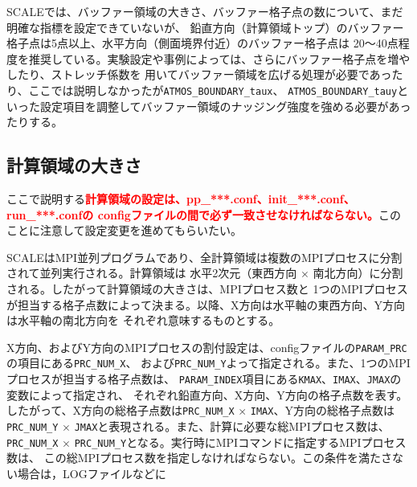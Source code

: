 SCALEでは、バッファー領域の大きさ、バッファー格子点の数について、まだ明確な指標を設定できていないが、
鉛直方向（計算領域トップ）のバッファー格子点は5点以上、水平方向（側面境界付近）のバッファー格子点は
20〜40点程度を推奨している。実験設定や事例によっては、さらにバッファー格子点を増やしたり、ストレッチ係数を
用いてバッファー領域を広げる処理が必要であったり、ここでは説明しなかったが\verb|ATMOS_BOUNDARY_taux|、
\verb|ATMOS_BOUNDARY_tauy|といった設定項目を調整してバッファー領域のナッジング強度を強める必要があったりする。



\subsection{計算領域の大きさ} \label{sec:adv_domainsize}
ここで説明する\textcolor{red}{\bf 計算領域の設定は、pp\_***.conf、init\_***.conf、run\_***.confの
configファイルの間で必ず一致させなければならない。}このことに注意して設定変更を進めてもらいたい。

SCALEはMPI並列プログラムであり、全計算領域は複数のMPIプロセスに分割されて並列実行される。計算領域は
水平2次元（東西方向 $\times$ 南北方向）に分割される。したがって計算領域の大きさは、MPIプロセス数と
1つのMPIプロセスが担当する格子点数によって決まる。以降、X方向は水平軸の東西方向、Y方向は水平軸の南北方向を
それぞれ意味するものとする。

X方向、およびY方向のMPIプロセスの割付設定は、configファイルの\verb|PARAM_PRC|の項目にある\verb|PRC_NUM_X|、
および\verb|PRC_NUM_Y|よって指定される。また、1つのMPIプロセスが担当する格子点数は、
\verb|PARAM_INDEX|項目にある\verb|KMAX|、\verb|IMAX|、\verb|JMAX|の変数によって指定され、
それぞれ鉛直方向、X方向、Y方向の格子点数を表す。
したがって、X方向の総格子点数は\verb|PRC_NUM_X| $\times$ \verb|IMAX|、Y方向の総格子点数は
\verb|PRC_NUM_Y| $\times$ \verb|JMAX|と表現される。また、計算に必要な総MPIプロセス数は、
\verb|PRC_NUM_X| $\times$ \verb|PRC_NUM_Y|となる。実行時にMPIコマンドに指定するMPIプロセス数は、
この総MPIプロセス数を指定しなければならない。この条件を満たさない場合は，LOGファイルなどに\\

{\small {\gt
{}}}\\

